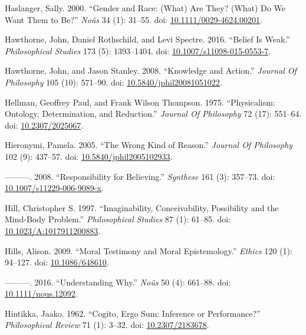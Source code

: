 \documentclass[
  10pt,
  letterpaper,
  DIV=11,
  numbers=noendperiod,
  twoside]{scrartcl}
\newlength{\cslhangindent}
\newenvironment{CSLReferences}[2] %
 {\begin{list}{}{%
  \setlength{\itemindent}{0pt}
  \setlength{\leftmargin}{0pt}
  \setlength{\parsep}{0pt}
  \ifodd #1
   \setlength{\leftmargin}{\cslhangindent}
   \setlength{\itemindent}{-1\cslhangindent}
  \fi
  \setlength{\itemsep}{#2\baselineskip}}}
 {\end{list}}
\begin{document}
\begin{CSLReferences}{1}{0}
Haslanger, Sally. 2000. {``Gender and Race: (What) Are They? (What) Do
We Want Them to Be?''} \emph{Noûs} 34 (1): 31--55. doi:
\href{https://doi.org/10.1111/0029-4624.00201}{10.1111/0029-4624.00201}.

Hawthorne, John, Daniel Rothschild, and Levi Spectre. 2016. {``Belief Is
Weak.''} \emph{Philosophical Studies} 173 (5): 1393--1404. doi:
\href{https://doi.org/10.1007/s11098-015-0553-7}{10.1007/s11098-015-0553-7}.

Hawthorne, John, and Jason Stanley. 2008. {``Knowledge and Action.''}
\emph{Journal Of Philosophy} 105 (10): 571--90. doi:
\href{https://doi.org/10.5840/jphil20081051022}{10.5840/jphil20081051022}.

Hellman, Geoffrey Paul, and Frank Wilson Thompson. 1975. {``Physicalism:
Ontology, Determination, and Reduction.''} \emph{Journal Of Philosophy}
72 (17): 551--64. doi:
\href{https://doi.org/10.2307/2025067}{10.2307/2025067}.

Hieronymi, Pamela. 2005. {``The Wrong Kind of Reason.''} \emph{Journal
Of Philosophy} 102 (9): 437--57. doi:
\href{https://doi.org/10.5840/jphil2005102933}{10.5840/jphil2005102933}.

---------. 2008. {``Responsibility for Believing.''} \emph{Synthese} 161
(3): 357--73. doi:
\href{https://doi.org/10.1007/s11229-006-9089-x}{10.1007/s11229-006-9089-x}.

Hill, Christopher S. 1997. {``Imaginability, Conceivability, Possibility
and the Mind-Body Problem.''} \emph{Philosophical Studies} 87 (1):
61--85. doi:
\href{https://doi.org/10.1023/A:1017911200883}{10.1023/A:1017911200883}.

Hills, Alison. 2009. {``Moral Testimony and Moral Epistemology.''}
\emph{Ethics} 120 (1): 94--127. doi:
\href{https://doi.org/10.1086/648610}{10.1086/648610}.

---------. 2016. {``Understanding Why.''} \emph{Noûs} 50 (4): 661--88.
doi: \href{https://doi.org/10.1111/nous.12092}{10.1111/nous.12092}.

Hintikka, Jaako. 1962. {``Cogito, Ergo Sum: Inference or Performance?''}
\emph{Philosophical Review} 71 (1): 3--32. doi:
\href{https://doi.org/10.2307/2183678}{10.2307/2183678}.


\end{CSLReferences}
\end{document}
